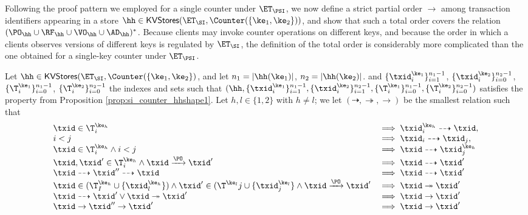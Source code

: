 Following the proof pattern we employed for a single counter under $\ET_{\PSI}$, we now 
define a strict partial order $\rightarrow$ among transaction identifiers appearing in a store 
$\hh \in \mathsf{KVStores}(\ET_{\SI},  \Counter(\{\ke_1, \ke_2\}))$, and show that such a 
total order covers the relation $(\PO_{\hh} \cup \RF_{\hh} \cup \VO_{\hh} \cup \AD_{\hh})^{\ast}$. 
Because clients may invoke counter operations on different keys, and because the 
order in which a clients observes versions of different keys is regulated by $\ET_{\SI}$, 
the definition of the total order is considerably more complicated than the one 
obtained for a single-key counter under $\ET_\PSI$.

\begin{definition}
\label{def:si_counter_order}
Let $\hh \in \mathsf{KVStores}(\ET_{\SI}, \Counter(\{\ke_1, \ke_2\})$, and let 
$n_1 = \lvert \hh(\ke_1) \rvert$, $n_2 = \lvert \hh(\ke_2) \rvert$. 
and $\{\txid_{i}^{\ke_1}\}_{i=1}^{n_1 - 1}$, $\{\txid_{i}^{\ke_2}\}_{i=0}^{n_2 - 1}$, 
$\{\T_{i}^{\ke_1}\}_{i=0}^{n_1-1}$, $\{\T_{i}^{\ke_2}\}_{i=0}^{n_2 - 1}$ the indexes 
and sets such that $(\hh, \{\txid_{i}^{\ke_{1}}\}_{i=1}^{n_1 - 1}, \{\txid^{\ke_2}_{i}\}_{i=1}^{n_2 - 1}, 
\{\T_{i}^{\ke_1}\}_{i=0}^{n_1 - 1}, \{\T_{i}^{\ke_2}\}_{i=0}^{n_2-1})$ satisfies the property from 
Proposition \ref{prop:si_counter_hhshape1}. Let $h, l \in \{1,2\}$ with $h \neq l$; we 
let $(\dashrightarrow, \twoheadrightarrow, \rightarrow)$ be the smallest relation such that 
\[
\begin{array}{ll}
\txid \in \T^{\ke_{h}}_{i} &\implies \txid^{\ke_{h}}_{i} \dashrightarrow \txid,\\
i < j &\implies \txid_{i} \dashrightarrow \txid_{j},\\
\txid \in \T^{\ke_{h}}_{i} \wedge i < j & \implies \txid \dashrightarrow \txid^{\ke_{h}}_{j}\\
\txid, \txid' \in \T^{\ke_{h}}_{i} \wedge \txid \xrightarrow{\PO} \txid' &\implies \txid \dashrightarrow \txid'\\
\txid \dashrightarrow \txid'' \dashrightarrow \txid &\implies \txid \dashrightarrow \txid'\\
\txid \in (\T^{\ke_{h}}_{I} \cup \{\txid^{\ke_{h}}_{l}\}) \wedge \txid' \in (\T^{\ke_{l}}{j} \cup \{\txid^{\ke_l}_{j}\} \wedge \txid \xrightarrow{\PO} \txid' &\implies \txid \twoheadrightarrow \txid'\\
\txid \dashrightarrow \txid' \vee \txid \twoheadrightarrow \txid' &\implies \txid \rightarrow \txid'\\
\txid \rightarrow \txid'' \rightarrow \txid' &\implies \txid \rightarrow \txid'
\end{array}
\]
%
\end{definition}
